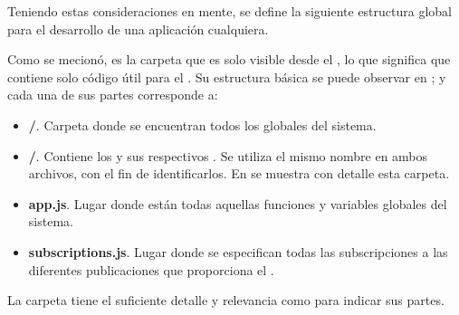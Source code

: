 Teniendo estas consideraciones en mente, se define la siguiente estructura global para el desarrollo de una aplicación cualquiera.





Como se mecionó, \clientFolder es la carpeta que es solo visible desde el \clientSideAS, lo que significa que contiene solo código útil para el \clientAS. Su estructura básica se puede observar en ; y cada una de sus partes corresponde a:

	\begin{itemize}
		\item
			\textbf{\helpersMETEOR/}. Carpeta donde se encuentran todos los \helpersMETEOR globales del sistema.
		\item
			\textbf{\templatesMETEOR/}. Contiene los \templatesMETEOR y sus respectivos \helpersMETEOR. Se utiliza el mismo nombre en ambos archivos, con el fin de identificarlos. En  se muestra con detalle esta carpeta.
		\item
			\textbf{app.js}. Lugar donde están todas aquellas funciones y variables globales del sistema.
		\item
			\textbf{subscriptions.js}. Lugar donde se especifican todas las subscripciones a las diferentes publicaciones que proporciona el \serverAS.
	\end{itemize}



La carpeta \templateMETEOR tiene el suficiente detalle y relevancia como para indicar sus partes.

